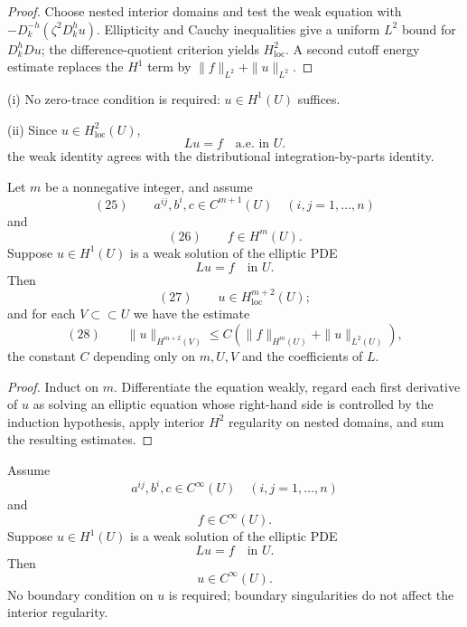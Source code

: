 \begin{proof}
\sketch Choose nested interior domains and test the weak equation with $-D_k^{-h}(\zeta^2D_k^hu)$. Ellipticity and Cauchy inequalities give a uniform $L^2$ bound for $D_k^hDu$; the difference-quotient criterion yields $H^2_{\mathrm{loc}}$. A second cutoff energy estimate replaces the $H^1$ term by $\|f\|_{L^2}+\|u\|_{L^2}$.
\end{proof}

\begin{remark}
\label{rem:interior-regularity-remarks}
(i) No zero-trace condition is required: $u\in H^1(U)$ suffices.

(ii) Since $u\in H^2_{\mathrm{loc}}(U)$,
$$Lu = f \quad \text{a.e. in } U.$$
the weak identity agrees with the distributional integration-by-parts identity.
\end{remark}

\begin{theorem}
\label{thm:higher-interior-regularity}
Let $m$ be a nonnegative integer, and assume
$$(25) \qquad a^{ij}, b^i, c \in C^{m+1}(U) \quad (i,j=1,\ldots,n)$$
and
$$(26) \qquad f \in H^m(U).$$
Suppose $u \in H^1(U)$ is a weak solution of the elliptic PDE
$$Lu = f \quad \text{in } U.$$
Then
$$(27) \qquad u \in H^{m+2}_{\text{loc}}(U);$$
and for each $V \subset\subset U$ we have the estimate
$$(28) \qquad \|u\|_{H^{m+2}(V)} \leq C(\|f\|_{H^m(U)} + \|u\|_{L^2(U)}),$$
the constant $C$ depending only on $m, U, V$ and the coefficients of $L$.
\end{theorem}

\begin{proof}
\sketch Induct on $m$. Differentiate the equation weakly, regard each first derivative of $u$ as solving an elliptic equation whose right-hand side is controlled by the induction hypothesis, apply interior $H^2$ regularity on nested domains, and sum the resulting estimates.
\end{proof}

\begin{theorem}
\label{thm:interior-infinite-differentiability}
Assume
$$a^{ij}, b^i, c \in C^\infty(U) \quad (i,j=1,\ldots,n)$$
and
$$f \in C^\infty(U).$$
Suppose $u \in H^1(U)$ is a weak solution of the elliptic PDE
$$Lu = f \quad \text{in } U.$$
Then
$$u \in C^\infty(U).$$
No boundary condition on $u$ is required; boundary singularities do not affect the interior regularity.
\end{theorem}


